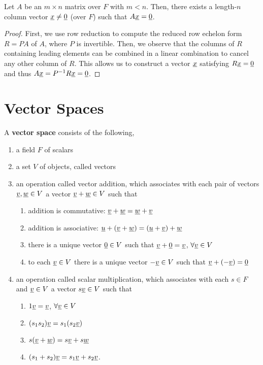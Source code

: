 \begin{lemma}
\label{lemma:widematrix_has_nullvector}
Let $A$ be an $m \times n$ matrix over $F$ with $m<n$.
Then, there exists a length-$n$ column vector $\underline{x} \neq \underline{0}$ (over $F$) such that $A \underline{x} = \underline{0}$.
\end{lemma}
\begin{proof}
First, we use row reduction to compute the reduced row echelon form $R=PA$ of $A$, where $P$ is invertible.
Then, we observe that the columns of $R$ containing leading elements can be combined in a linear combination to cancel any other column of $R$.
This allows us to construct a vector $\underline{x}$ satisfying $R\underline{x}=\underline{0}$ and thus $A \underline{x} = P^{-1} R \underline{x} = \underline{0}$.
\end{proof}

\section{Vector Spaces}

\begin{definition} \label{definition:VectorSpace}
A \textbf{vector space} consists of the following,
\begin{enumerate}
\item a field $F$ of scalars
\item a set $V$ of objects, called vectors
\item an operation called vector addition, which associates with each pair of vectors $\underline{v}, \underline{w} \in V$ a vector $\underline{v} + \underline{w} \in V$ such that
\begin{enumerate}
\item addition is commutative: $\underline{v} + \underline{w} = \underline{w} + \underline{v}$
\item addition is associative: $\underline{u} + (\underline{v} + \underline{w}) = (\underline{u} + \underline{v}) + \underline{w}$
\item there is a unique vector $\underline{0} \in V$ such that $\underline{v} + \underline{0} = \underline{v}$, $\forall \underline{v} \in V$
\item to each $\underline{v} \in V$ there is a unique vector $- \underline{v} \in V$ such that $\underline{v} + (- \underline{v}) = \underline{0}$
\end{enumerate}
\item an operation called scalar multiplication, which associates with each $s \in F$ and $\underline{v} \in V$ a vector $s \underline{v} \in V$ such that
\begin{enumerate}
\item $1 \underline{v} = \underline{v}$, $\forall \underline{v} \in V$
\item $(s_1 s_2) \underline{v} = s_1 ( s_2 \underline{v} )$
\item $s ( \underline{v} + \underline{w} ) = s \underline{v} + s \underline{w}$
\item $(s_1 + s_2) \underline{v} = s_1 \underline{v} + s_2 \underline{v}$.
\end{enumerate}
\end{enumerate}
\end{definition}

